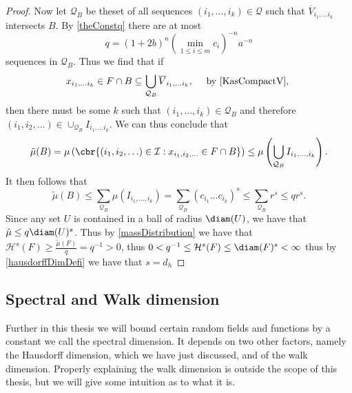 \begin{proof}
	Now let $\mathcal{Q}_{B}$ be theset of all sequences $(i_1, \ldots, i_k) \in \mathcal{Q}$ such that $\overline{V}_{i_1, \ldots i_k}$ intersects $B$. By \cref{theConstq} there are at most
	$$q = (1+2b)^{n} \left(\min_{1\leq i \leq m} c_i\right)^{-n} a^{-n}$$
	sequences in $\mathcal{Q}_{B}$. Thus we find that if
	\begin{equation}
		x_{i_1, \ldots i_k} \in F \cap B \subseteq \bigcup_{\mathcal{Q}_{B}} \overline{V}_{i_1, \ldots i_k}, \quad \text{ by \eqref{KasCompactV}, }
	\end{equation}
	then there must be some $k$ such that $(i_1, \ldots, i_k) \in \mathcal{Q}_{B}$ and therefore $(i_1, i_2, \ldots) \in \cup_{\mathcal{Q}_{B}} I_{i_1, \ldots i_k}$. We can thus conclude that
	\begin{equation}
		\tilde{\mu}(B) = \mu \left(\cbr{(i_1, i_2, \ldots) \in \mathcal{I} : x_{i_1, i_2, \ldots} \in F \cap B}\right) \leq \mu \left(\bigcup_{\mathcal{Q}_{B}} I_{i_1, \ldots, i_k}\right).
	\end{equation}
	It then follows that
	\begin{equation}
		\tilde{\mu}(B) \leq \sum_{\mathcal{Q}_{B}} \mu\left(I_{i_1, \ldots, i_k}\right) = \sum_{\mathcal{Q}_{B}} \left(c_{i_1} \dots c_{i_k}\right)^{s} \leq \sum_{\mathcal{Q}_{B}} r^{s} \leq qr^{s}.
	\end{equation}
	Since any set $U$ is contained in a ball of radius $\diam(U)$, we have that $\tilde{\mu} \leq q \diam(U)^{s}$. Thus by \cref{massDistribution} we have that $\mathcal{H}^{s}(F) \geq \frac{\tilde{\mu}(F)}{q} = q^{-1} > 0$, thus $0 < q^{-1} \leq \mathcal{H}^{s}(F) \leq \diam(F)^{s} < \infty$ thus by \cref{hausdorffDimDefi} we have that $s = d_h$
\end{proof}

\subsection{Spectral and Walk dimension}
Further in this thesis we will bound certain random fields and functions by a constant we call the spectral dimension. It depends on two other factors, namely the Hausdorff dimension, which we have just discussed, and of the walk dimension. Properly explaining the walk dimension is outside the scope of this thesis, but we will give some intuition as to what it is.

